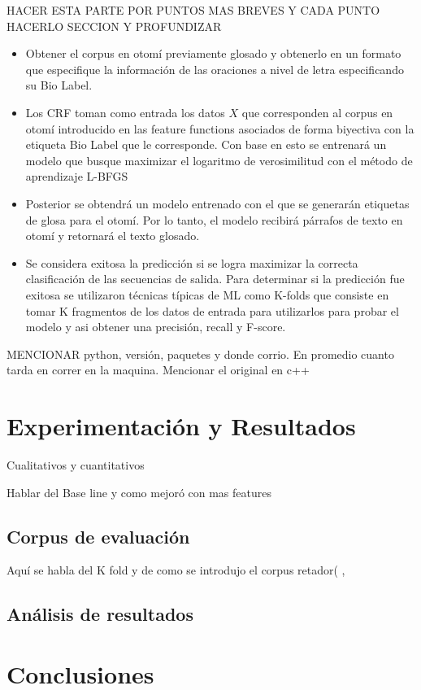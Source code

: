 \documentclass[letterpaper,12pt,oneside]{book}
\begin{document}
HACER ESTA PARTE POR PUNTOS MAS BREVES Y CADA PUNTO HACERLO SECCION Y PROFUNDIZAR

\begin{itemize}
	\item Obtener el corpus en otomí previamente glosado y obtenerlo en un
		formato que especifique la información de las oraciones a nivel
		de letra especificando su Bio Label.
	\item Los CRF toman como entrada los datos $X$ que corresponden al
		corpus en otomí introducido en las feature functions asociados
		de forma biyectiva con la etiqueta Bio Label que le corresponde.
		Con base en esto se entrenará un modelo que busque maximizar el
		logaritmo de verosimilitud con el método de aprendizaje L-BFGS
	\item Posterior se obtendrá un modelo entrenado con el que se generarán
		etiquetas de glosa para el otomí. Por lo tanto, el modelo
		recibirá párrafos de texto en otomí y retornará el texto
		glosado.
	\item Se considera exitosa la predicción si se logra maximizar la
		correcta clasificación de las secuencias de salida. Para
		determinar si la predicción fue exitosa se utilizaron técnicas
		típicas de ML como K-folds que consiste en tomar K fragmentos
		de los datos de entrada para utilizarlos para probar el modelo
		y asi obtener una precisión, recall y F-score.
\end{itemize}

MENCIONAR python, versión, paquetes y donde corrio. En promedio cuanto tarda
en correr en la maquina. Mencionar el original en c++


\chapter{Experimentación y Resultados}

Cualitativos y cuantitativos

Hablar del Base line y como mejoró con mas features

\section{Corpus de evaluación}

Aquí se habla del K fold y de como se introdujo el corpus retador( ,

\citet{singh2005comparison}

\section{Análisis de resultados}

\chapter{Conclusiones}



\end{document}
